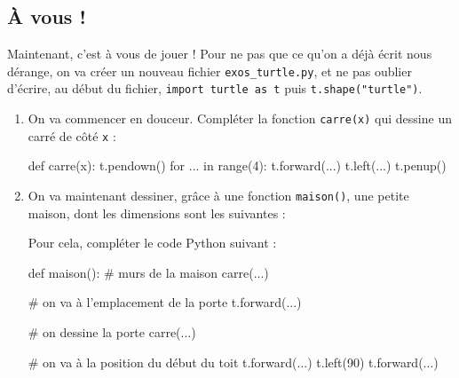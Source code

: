 \documentclass[12pt,a4paper, oneside]{article}
\theoremstyle{definition}
\begin{document}
   \subsection{À vous !}\label{subsec:à-vous-!}
      Maintenant, c'est à vous de jouer !
      Pour ne pas que ce qu'on a déjà écrit nous dérange, on va créer un nouveau fichier \texttt{exos\_turtle.py}, et ne pas oublier d'écrire, au début du fichier, \texttt{import turtle as t} puis \texttt{t.shape("turtle")}.

      \begin{enumerate}
         \item On va commencer en douceur.
         Compléter la fonction \texttt{carre(x)} qui dessine un carré de côté \texttt{x} :
         \begin{pyverbatim}
      def carre(x):
         t.pendown()
         for ... in range(4):
            t.forward(...)
            t.left(...)
         t.penup()
         \end{pyverbatim}
         \item On va maintenant dessiner, grâce à une fonction \texttt{maison()}, une petite maison, dont les dimensions sont les suivantes :
         \begin{center}
         \end{center}
         Pour cela, compléter le code Python suivant :
            \begin{pyverbatim}
      def maison():
         # murs de la maison
         carre(...)

         # on va à l'emplacement de la porte
         t.forward(...)

         # on dessine la porte
         carre(...)

         # on va à la position du début du toit
         t.forward(...)
         t.left(90)
         t.forward(...)


\end{pyverbatim}
\end{enumerate}
\end{document}
